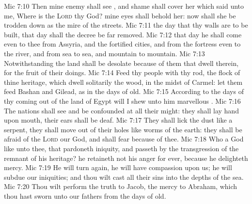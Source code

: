 \vs Mic 7:10 Then  mine enemy shall see , and shame shall cover her which said unto me, Where is the \textsc{Lord} thy God? mine eyes shall behold her: now shall she be trodden down as the mire of the streets.
\vs Mic 7:11  the day that thy walls are to be built,  that day shall the decree be far removed.
\vs Mic 7:12  that day  he shall come even to thee from Assyria, and  the fortified cities, and from the fortress even to the river, and from sea to sea, and  mountain to mountain.
\vs Mic 7:13 Notwithstanding the land shall be desolate because of them that dwell therein, for the fruit of their doings.
\vs Mic 7:14 Feed thy people with thy rod, the flock of thine heritage, which dwell solitarily  the wood, in the midst of Carmel: let them feed  Bashan and Gilead, as in the days of old.
\vs Mic 7:15 According to the days of thy coming out of the land of Egypt will I shew unto him marvellous .
\vs Mic 7:16 The nations shall see and be confounded at all their might: they shall lay  hand upon  mouth, their ears shall be deaf.
\vs Mic 7:17 They shall lick the dust like a serpent, they shall move out of their holes like worms of the earth: they shall be afraid of the \textsc{Lord} our God, and shall fear because of thee.
\vs Mic 7:18 Who  a God like unto thee, that pardoneth iniquity, and passeth by the transgression of the remnant of his heritage? he retaineth not his anger for ever, because he delighteth  mercy.
\vs Mic 7:19 He will turn again, he will have compassion upon us; he will subdue our iniquities; and thou wilt cast all their sins into the depths of the sea.
\vs Mic 7:20 Thou wilt perform the truth to Jacob,  the mercy to Abraham, which thou hast sworn unto our fathers from the days of old.
